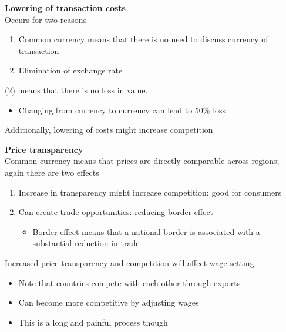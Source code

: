 \documentclass{beamer}
\begin{document}
\begin{frame}
  \textbf{Lowering of transaction costs}\\
  Occurs for two reasons
  \begin{enumerate}
    \item Common currency means that there is no need to discuss currency of transaction
    \item Elimination of exchange rate
  \end{enumerate}
  (2) means that there is no loss in value. 
  \begin{itemize}
    \item Changing from currency to currency can lead to 50\% loss
  \end{itemize}
  \medskip
  Additionally, lowering of costs might increase competition  
\end{frame}

\begin{frame}
  \textbf{Price transparency}\\
  Common currency means that prices are directly comparable across regions; again there are two effects
  \begin{enumerate}
    \item Increase in transparency might increase competition: good for consumers
    \item Can create trade opportunities: reducing border effect
    \begin{itemize}
      \item Border effect means that a national border is associated with a substantial reduction in trade
    \end{itemize}
  \end{enumerate}
\end{frame}

\begin{frame}
  Increased price transparency and competition will affect wage setting
    \begin{itemize}
    \item Note that countries compete with each other through exports
    \item Can become more competitive by adjusting wages   
    \item This is a long and painful process though
  \end{itemize}  
\end{frame}
\end{document}
